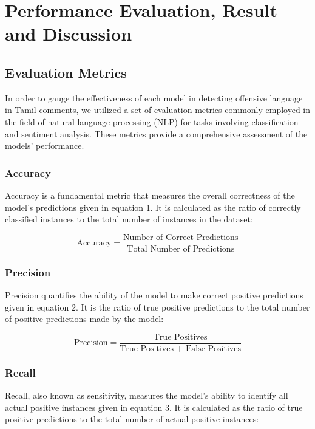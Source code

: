 \documentclass{svproc}
\begin{document}
\section{Performance Evaluation, Result and Discussion}

\subsection{Evaluation Metrics}

In order to gauge the effectiveness of each model in detecting offensive language in Tamil comments, we utilized a set of evaluation metrics commonly employed in the field of natural language processing (NLP) for tasks involving classification and sentiment analysis. These metrics provide a comprehensive assessment of the models' performance.
\subsubsection{Accuracy}

Accuracy is a fundamental metric that measures the overall correctness of the model's predictions given in equation 1. It is calculated as the ratio of correctly classified instances to the total number of instances in the dataset:

\begin{equation}
\text{Accuracy} = \frac{\text{Number of Correct Predictions}}{\text{Total Number of Predictions}} \label{eq:accuracy}
\end{equation}


\subsubsection{Precision}

Precision quantifies the ability of the model to make correct positive predictions given in equation 2. It is the ratio of true positive predictions to the total number of positive predictions made by the model:

\begin{equation}
\text{Precision} = \frac{\text{True Positives}}{\text{True Positives + False Positives}} \label{eq:precision}
\end{equation}


\subsubsection{Recall}

Recall, also known as sensitivity, measures the model's ability to identify all actual positive instances given in equation 3. It is calculated as the ratio of true positive predictions to the total number of actual positive instances:
\end{document}
